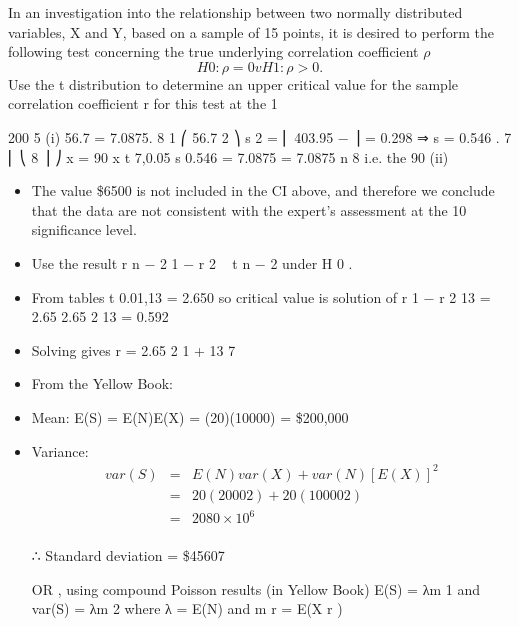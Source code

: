 \documentclass[a4paper,12pt]{article}
\begin{document}
\newpage

In an investigation into the relationship between two normally distributed variables, X
and Y, based on a sample of 15 points, it is desired to perform the following test
concerning the true underlying correlation coefficient $\rho$
\[H 0 : \rho = 0 v H 1 : \rho > 0.\]
Use the t distribution to determine an upper critical value for the sample correlation
coefficient r for this test at the 1%

200
5
(i)
56.7
= 7.0875.
8
1 ⎛
56.7 2 ⎞
s 2 = ⎜ 403.95 −
⎟ = 0.298 ⇒ s = 0.546 .
7 ⎜ ⎝
8 ⎟ ⎠
x =
90%
x \pm t 7,0.05
s
0.546
= 7.0875 
= 7.0875 
n
8
i.e. the 90%
(ii)
\begin{itemize}
\item The value \$6500 is not included in the CI above, and therefore we conclude
that the data are not consistent with the expert’s assessment at the 10%
significance level.
\item Use the result
r n − 2
1 − r 2
~ t n − 2 under H 0 .
\item From tables t 0.01,13 = 2.650
so critical value is solution of
r
1 − r 2
13 = 2.65
2.65 2
13
= 0.592
\item Solving gives r =
2.65 2
1 +
13
7
\item From the Yellow Book:
\item Mean:
E(S) = E(N)E(X) = (20)(10000) = \$200,000
\item Variance: 
\begin{eqnarray*}var(S) &=& E(N) var(X) + var(N)[E(X)]^2\\
&=& 20(2000 2 ) + 20(10000 2 ) \\ &=& 2080 × 10^6\\
\end{eqnarray*}

∴ Standard deviation = \$45607
\item [ OR , using compound Poisson results (in Yellow Book)
E(S) = λm 1 and var(S) = λm 2 where λ = E(N) and m r = E(X r )]
\end{itemize}
\end{document}
